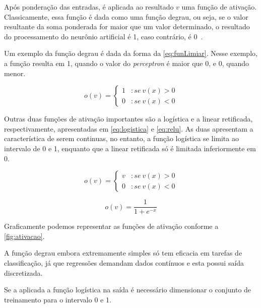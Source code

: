 \documentclass[
    12pt,
    oneside,
    a4paper,
    english,
    brazil
]{abntex2}
\begin{document}
Após  ponderação das  entradas,  é  aplicada ao  resultado  $v$  uma função  de
ativação. Classicamente, essa função é dada como uma função degrau, ou seja, se
o valor  resultante da  soma ponderada  for maior que  um valor  determinado, o
resultado  do processamento  do  neurônio  artificial é  1,  caso contrário,  é
0~\cite{knight}.

Um exemplo da função degrau é dada da forma da \autoref{eq:funLimiar}. Nesse
exemplo, a função  resulta em 1, quando o valor  do \textit{perceptron} é maior
que 0, e 0, quando menor.

\begin{equation}
    \label{eq:funLimiar}
    o(v) = \left\{
        \begin{array}{lr}
            1 & :se\  v(x) > 0\\
            0 & :se\  v(x) < 0
        \end{array}
    \right.
\end{equation}

Outras  duas  funções de  ativação  importantes  são  a  logística e  a  linear
retificada,   respectivamente,   apresentadas   em   \autoref{eq:logistica}   e
\autoref{eq:relu}. As duas  apresentam a característica de  serem continuas, no
entanto, a  função logística se limita  ao intervalo de  0 e 1, enquanto  que a
linear retificada só é limitada inferiormente em 0.

\begin{equation}
    \label{eq:relu}
    o(v) = \left\{
        \begin{array}{lr}
            v & :se\  v(x) > 0\\
            0 & :se\  v(x) < 0
        \end{array}
    \right.
\end{equation}

\begin{equation}
    \label{eq:logistica}
    o(v) = \frac{1}{1+e^{-x}}
\end{equation}

Graficamente   podemos  representar   as   funções  de   ativação  conforme   a
\autoref{fig:ativacao}.

A  função degrau  embora extremamente  simples só  tem eficacia  em tarefas  de
classificação, já que  regressões demandam dados contínuos e  esta possui saída
discretizada.

Se a aplicada  a função logística na saída é  necessário dimensionar o conjunto
de treinamento para o intervalo 0 e 1.
\end{document}
